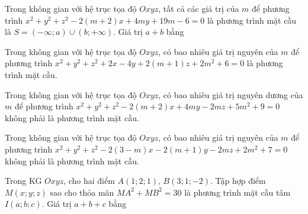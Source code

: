 \begin{ex}%
	Trong không gian với hệ trục tọa độ $Oxyz$, tất cả các giá trị của $m$ để phương trình $x^2+y^2+z^2-2(m+2)x+4my+19m-6=0$ là phương trình mặt cầu là $S=(-\infty;a)\cup(b;+\infty)$. Giá trị $a+b$ bằng
\end{ex}
\begin{ex}%
	Trong không gian với hệ trục tọa độ $Oxyz$, có bao nhiêu giá trị nguyên của $m$ để phương trình $x^2+y^2+z^2+2x-4y+2(m+1)z+2m^2+6=0$ là phương trình mặt cầu.
\end{ex}
\begin{ex}%
	Trong không gian với hệ trục tọa độ $Oxyz$, có bao nhiêu giá trị nguyên dương của $m$ để phương trình $x^2+y^2+z^2-2(m+2)x+4my-2mz+5m^2+9=0$ không phải là phương trình mặt cầu.
\end{ex}
\begin{ex}%
	Trong không gian với hệ trục tọa độ $Oxyz$, có bao nhiêu giá trị nguyên của $m$ để phương trình $x^2+y^2+z^2-2(3-m)x-2(m+1)y-2mz+2m^2+7=0$ không phải là phương trình mặt cầu.
\end{ex}
\begin{ex}%
	Trong KG $Oxyz$, cho hai điểm $A(1;2;1)$, $B(3;1;-2)$. Tập hợp điểm $M(x;y;z)$ sao cho thỏa mãn $MA^2+MB^2=30$ là phương trình mặt cầu tâm $I(a;b;c)$. Giá trị $a+b+c$ bằng
\end{ex}
